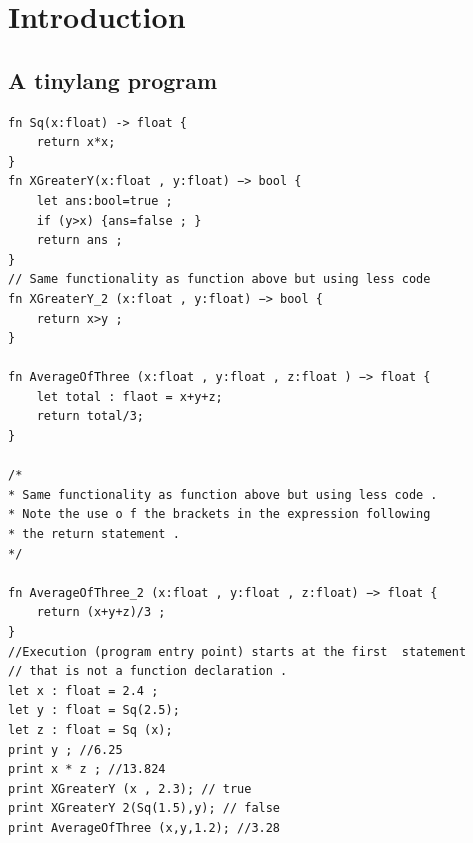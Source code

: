\setcounter{chapter}{-1}
\chapter{Introduction}
\section{A tinylang program}
\begin{lstlisting}[caption = A semantically and syntactically correct program in \emph{TinyLang}.]
fn Sq(x:float) -> float {
    return x*x;
}
fn XGreaterY(x:float , y:float) −> bool {
    let ans:bool=true ;
    if (y>x) {ans=false ; }
    return ans ;
}
// Same functionality as function above but using less code
fn XGreaterY_2 (x:float , y:float) −> bool {
    return x>y ;
}

fn AverageOfThree (x:float , y:float , z:float ) −> float {
    let total : flaot = x+y+z;
    return total/3;
}

/*
* Same functionality as function above but using less code .
* Note the use o f the brackets in the expression following
* the return statement .
*/

fn AverageOfThree_2 (x:float , y:float , z:float) −> float {
    return (x+y+z)/3 ;
}
//Execution (program entry point) starts at the first  statement
// that is not a function declaration .
let x : float = 2.4 ;
let y : float = Sq(2.5);
let z : float = Sq (x);
print y ; //6.25
print x * z ; //13.824
print XGreaterY (x , 2.3); // true
print XGreaterY 2(Sq(1.5),y); // false
print AverageOfThree (x,y,1.2); //3.28
\end{lstlisting}

